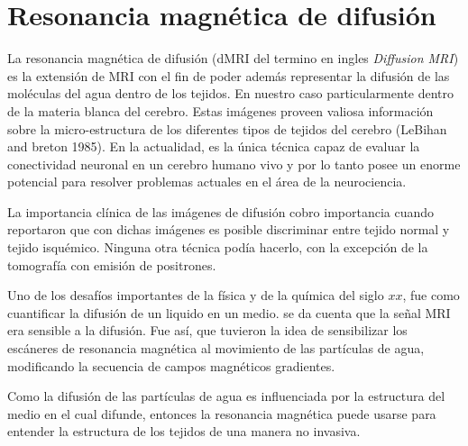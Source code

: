 \section{Resonancia magnética de difusi\'on}


La resonancia magnética de difusi\'on (dMRI del termino en ingles 
\textit{Diffusion MRI}) es la extensi\'on de MRI con el fin de poder adem\'as  
representar la 
difusi\'on de las mol\'eculas del agua dentro de los tejidos. En nuestro caso particularmente 
dentro de la materia blanca del cerebro. Estas im\'agenes proveen valiosa información sobre la 
micro-estructura de los diferentes tipos de tejidos del cerebro (LeBihan and breton 1985). En la 
actualidad, es la única técnica capaz de evaluar 
la conectividad neuronal en un cerebro humano vivo y por lo tanto posee un enorme potencial para 
resolver problemas actuales en el área de la neurociencia.

La importancia cl\'inica de las im\'agenes de difusi\'on cobro 
importancia cuando \citet{Moseley1990} reportaron que con dichas im\'agenes es 
posible discriminar entre tejido normal y tejido isqu\'emico. Ninguna 
otra t\'ecnica pod\'ia hacerlo, con la excepci\'on de la tomograf\'ia con 
emisi\'on de positrones. 

Uno de los desafíos importantes de la física y de la química del siglo $xx$, 
fue como cuantificar la difusión de un liquido en un medio. \citet{Hahn1950} se da 
cuenta que la señal MRI era sensible a la difusión. Fue as\'i, que \citet{CarrH.Y.andPurcell1954} 
tuvieron la idea de sensibilizar los escáneres de resonancia magnética al movimiento de las 
part\'iculas de agua, 
modificando la secuencia de campos magn\'eticos gradientes.

Como la difusi\'on de las part\'iculas de agua es influenciada por la estructura del medio en el 
cual difunde, entonces la resonancia magnética puede usarse para entender la 
estructura de los tejidos de una manera no invasiva.  


